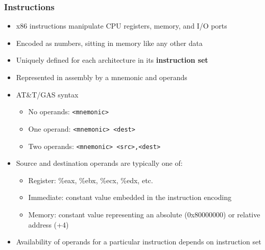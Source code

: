 \documentclass[11pt,xcolor=dvipsnames]{beamer}
\newcommand{\vs}{\vspace{0.5em}}
\begin{document}
\begin{frame}[fragile,t]
\frametitle{Instructions}
\begin{itemize}
    \item x86 instructions manipulate CPU registers, memory, and I/O ports
    \item Encoded as numbers, sitting in memory like any other data
    \item Uniquely defined for each architecture in its {\bf instruction set}
\end{itemize}
\vs
\pause
\begin{itemize}
    \item Represented in assembly by a mnemonic and operands
    \item AT\&T/GAS syntax
    \begin{itemize}
    \item No operands: \verb+<mnemonic>+
    \item One operand: \verb+<mnemonic> <dest>+
    \item Two operands: \verb+<mnemonic> <src>,<dest>+
    \pause
    \end{itemize}
    \item Source and destination operands are typically one of:
    \begin{itemize}
        \item Register: {\ttfamily \%eax, \%ebx, \%ecx, \%edx,} etc.
        \item Immediate: constant value embedded in the instruction encoding
        \item Memory: constant value representing an absolute (0x80000000) or relative address (+4)
    \end{itemize}
    \pause
    \item Availability of operands for a particular instruction depends on instruction set
\end{itemize}
\end{frame}
\end{document}
